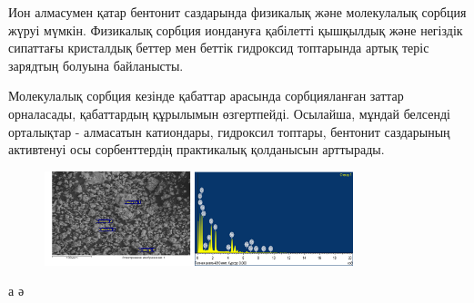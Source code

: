 Ион алмасумен қатар бентонит саздарында физикалық және молекулалық
сорбция жүруі мүмкін. Физикалық сорбция иондануға қабілетті қышқылдық
және негіздік сипаттағы кристалдық беттер мен беттік гидроксид
топтарында артық теріс зарядтың болуына байланысты.

Молекулалық сорбция кезінде қабаттар арасында сорбцияланған заттар
орналасады, қабаттардың құрылымын өзгертпейді. Осылайша, мұндай белсенді
орталықтар - алмасатын катиондары, гидроксил топтары, бентонит
саздарының активтенуі осы сорбенттердің практикалық қолданысын
арттырады.

\begin{figure}[H]
	\centering
	\includegraphics[width=0.8\textwidth]{assets/1048}
	\caption*{}
\end{figure}

а ә

